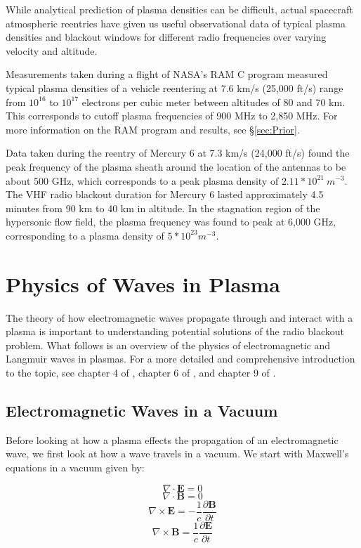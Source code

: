 \documentclass[twocolumn]{article}
\begin{document}
While analytical prediction of plasma densities can be difficult, actual spacecraft atmospheric reentries have given us useful observational data of typical plasma densities and blackout windows for different radio frequencies over varying velocity and altitude.

Measurements taken during a flight of NASA's RAM C program measured typical plasma densities of a vehicle reentering at 7.6 km/s (25,000 ft/s) range from $10^{16}$ to $10^{17}$ electrons per cubic meter between altitudes of 80 and 70 km.\cite{akey_radio_1970}
This corresponds to cutoff plasma frequencies of 900 MHz to 2,850 MHz.
For more information on the RAM program and results, see \S\ref{sec:Prior}.

Data taken during the reentry of Mercury 6 at 7.3 km/s (24,000 ft/s) found the peak frequency of the plasma sheath around the location of the antennas to be about 500 GHz, which corresponds to a peak plasma density of $2.11*10^{21} \  m^{-3}$.
The VHF radio blackout duration for Mercury 6 lasted approximately 4.5 minutes from 90 km to 40 km in altitude.
In the stagnation region of the hypersonic flow field, the plasma frequency was found to peak at 6,000 GHz, corresponding to a plasma density of $5*10^{23} m^{-3}$. \cite{lehnert_plasma_1964}


\section{Physics of Waves in Plasma} \label{sec:Waves}
The theory of how electromagnetic waves propagate through and interact with a plasma is important to understanding potential solutions of the radio blackout problem.
What follows is an overview of the physics of electromagnetic and Langmuir waves in plasmas.
For a more detailed and comprehensive introduction to the topic, see chapter 4 of \cite{chen_introduction_1984}, chapter 6 of \cite{papas_theory_1965}, and chapter 9 of \cite{fitzpatrick_maxwells_2008}.

\subsection*{Electromagnetic Waves in a Vacuum}
Before looking at how a plasma effects the propagation of an electromagnetic wave, we first look at how a wave travels in a vacuum.
We start with Maxwell's equations in a vacuum given by:

\begin{equation}
	\nabla \cdot \mathbf{E} = 0
\end{equation}
\begin{equation}
	\nabla \cdot \mathbf{B} = 0
\end{equation}
\begin{equation} 
	\label{eq:MaxVacCurlE}
	\nabla \times \mathbf{E} = -\frac{1}{c} \frac{\partial \mathbf{B}}{\partial t}
\end{equation}
\begin{equation} 
	\label{eq:MaxVacCurlB}
	\nabla \times \mathbf{B} = \frac{1}{c} \frac{\partial \mathbf{E}}{\partial t}
\end{equation}
\end{document}
